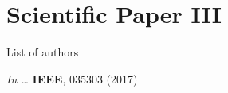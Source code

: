 \renewcommand{\boxsizept}{56pt}
\chapter{Scientific Paper III}
\thispagestyle{empty}

\noindent List of authors\vspace{3ex}

\noindent \textit{In \Proc \IntlConf \ldots} \textbf{IEEE}, 035303 (2017)
\cleardoublepage


\pagestyle{compiledpapers} %
%
\Blinddocument %
